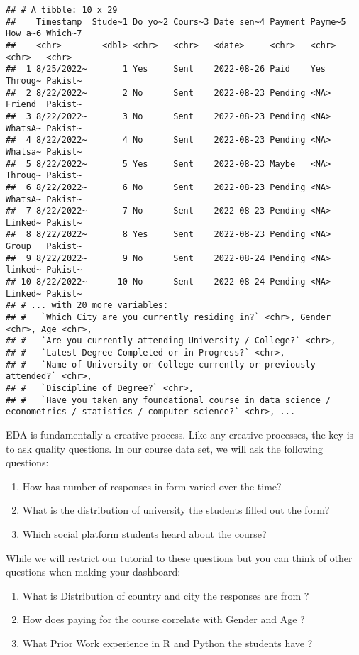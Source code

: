 \documentclass[
]{article}
\providecommand{\tightlist}{%
  \setlength{\itemsep}{0pt}\setlength{\parskip}{0pt}}
\begin{document}
\begin{verbatim}
## # A tibble: 10 x 29
##    Timestamp  Stude~1 Do yo~2 Cours~3 Date sen~4 Payment Payme~5 How a~6 Which~7
##    <chr>        <dbl> <chr>   <chr>   <date>     <chr>   <chr>   <chr>   <chr>  
##  1 8/25/2022~       1 Yes     Sent    2022-08-26 Paid    Yes     Throug~ Pakist~
##  2 8/22/2022~       2 No      Sent    2022-08-23 Pending <NA>    Friend  Pakist~
##  3 8/22/2022~       3 No      Sent    2022-08-23 Pending <NA>    WhatsA~ Pakist~
##  4 8/22/2022~       4 No      Sent    2022-08-23 Pending <NA>    Whatsa~ Pakist~
##  5 8/22/2022~       5 Yes     Sent    2022-08-23 Maybe   <NA>    Throug~ Pakist~
##  6 8/22/2022~       6 No      Sent    2022-08-23 Pending <NA>    WhatsA~ Pakist~
##  7 8/22/2022~       7 No      Sent    2022-08-23 Pending <NA>    Linked~ Pakist~
##  8 8/22/2022~       8 Yes     Sent    2022-08-23 Pending <NA>    Group   Pakist~
##  9 8/22/2022~       9 No      Sent    2022-08-24 Pending <NA>    linked~ Pakist~
## 10 8/22/2022~      10 No      Sent    2022-08-24 Pending <NA>    Linked~ Pakist~
## # ... with 20 more variables:
## #   `Which City are you currently residing in?` <chr>, Gender <chr>, Age <chr>,
## #   `Are you currently attending University / College?` <chr>,
## #   `Latest Degree Completed or in Progress?` <chr>,
## #   `Name of University or College currently or previously attended?` <chr>,
## #   `Discipline of Degree?` <chr>,
## #   `Have you taken any foundational course in data science / econometrics / statistics / computer science?` <chr>, ...
\end{verbatim}

EDA is fundamentally a creative process. Like any creative processes,
the key is to ask quality questions. In our course data set, we will ask
the following questions:

\begin{enumerate}
\def\labelenumi{\arabic{enumi}.}
\tightlist
\item
  How has number of responses in form varied over the time?
\item
  What is the distribution of university the students filled out the
  form?
\item
  Which social platform students heard about the course?
\end{enumerate}

While we will restrict our tutorial to these questions but you can think
of other questions when making your dashboard:

\begin{enumerate}
\def\labelenumi{\arabic{enumi}.}
\tightlist
\item
  What is Distribution of country and city the responses are from ?
\item
  How does paying for the course correlate with Gender and Age ?
\item
  What Prior Work experience in R and Python the students have ?
\end{enumerate}
\end{document}
